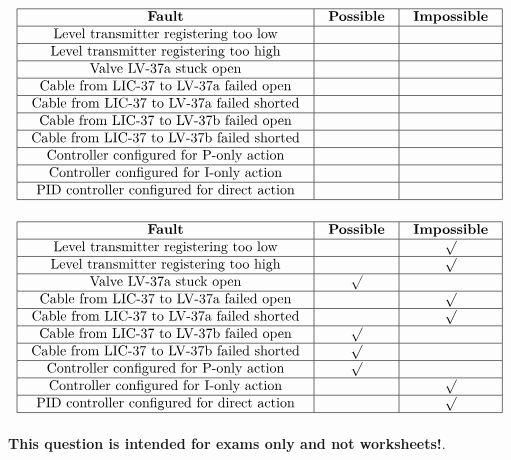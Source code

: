 $$\vbox{\offinterlineskip
\halign{\strut
\vrule \quad\hfil # \ \hfil & 
\vrule \quad\hfil # \ \hfil & 
\vrule \quad\hfil # \ \hfil \vrule \cr
\noalign{\hrule}
%
{\bf Fault} & {\bf Possible} & {\bf Impossible} \cr
%
\noalign{\hrule}
%
Level transmitter registering too low &  & \cr
%
\noalign{\hrule}
%
Level transmitter registering too high &  & \cr
%
\noalign{\hrule}
%
Valve LV-37a stuck open &  & \cr
%
\noalign{\hrule}
%
Cable from LIC-37 to LV-37a failed open &  & \cr
%
\noalign{\hrule}
%
Cable from LIC-37 to LV-37a failed shorted &  & \cr
%
\noalign{\hrule}
%
Cable from LIC-37 to LV-37b failed open &  & \cr
%
\noalign{\hrule}
%
Cable from LIC-37 to LV-37b failed shorted &  & \cr
%
\noalign{\hrule}
%
Controller configured for P-only action &  & \cr
%
\noalign{\hrule}
%
Controller configured for I-only action &  & \cr
%
\noalign{\hrule}
%
PID controller configured for direct action &  & \cr
%
\noalign{\hrule}
} %
}$$ %








$$\vbox{\offinterlineskip
\halign{\strut
\vrule \quad\hfil # \ \hfil & 
\vrule \quad\hfil # \ \hfil & 
\vrule \quad\hfil # \ \hfil \vrule \cr
\noalign{\hrule}
%
{\bf Fault} & {\bf Possible} & {\bf Impossible} \cr
%
\noalign{\hrule}
%
Level transmitter registering too low &  & $\surd$ \cr
%
\noalign{\hrule}
%
Level transmitter registering too high &  & $\surd$ \cr
%
\noalign{\hrule}
%
Valve LV-37a stuck open & $\surd$ & \cr
%
\noalign{\hrule}
%
Cable from LIC-37 to LV-37a failed open &  & $\surd$ \cr
%
\noalign{\hrule}
%
Cable from LIC-37 to LV-37a failed shorted &  & $\surd$ \cr
%
\noalign{\hrule}
%
Cable from LIC-37 to LV-37b failed open & $\surd$  & \cr
%
\noalign{\hrule}
%
Cable from LIC-37 to LV-37b failed shorted & $\surd$  &  \cr
%
\noalign{\hrule}
%
Controller configured for P-only action & $\surd$ & \cr
%
\noalign{\hrule}
%
Controller configured for I-only action &  & $\surd$ \cr
%
\noalign{\hrule}
%
PID controller configured for direct action &  & $\surd$ \cr
%
\noalign{\hrule}
} %
}$$ %








{\bf This question is intended for exams only and not worksheets!}.


